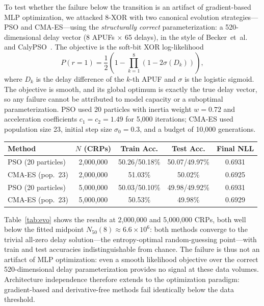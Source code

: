 To test whether the failure below the transition is an artifact of
gradient-based MLP optimization, we attacked 8-XOR with two canonical
evolution strategies---PSO and CMA-ES---using the \emph{structurally
correct} parameterization: a 520-dimensional delay vector (8 APUFs
$\times$ 65 delays), in the style of
Becker~et~al.~\cite{becker2015cia} and CalyPSO~\cite{calypso2024}.  The
objective is the soft-bit XOR log-likelihood
\[
P(r = 1) = \frac{1}{2}\left(1 - \prod_{k=1}^{8}\left(1 - 2\sigma(D_k)\right)\right),
\]
where $D_k$ is the delay difference of the $k$-th APUF and $\sigma$ is the
logistic sigmoid.  The objective is smooth, and its global optimum is exactly the true delay
vector, so any failure cannot be attributed to model capacity or a
suboptimal parameterization.  PSO used 20 particles
with inertia weight $w = 0.72$ and acceleration coefficients
$c_1 = c_2 = 1.49$ for 5{,}000 iterations; CMA-ES used population size 23,
initial step size $\sigma_0 = 0.3$, and a budget of 10{,}000 generations.

\tablefloatbegin
\centering
\caption{Evolution-strategy baselines on 8-XOR, all below the transition
midpoint.  All runs use the soft-bit XOR log-likelihood over the
520-dimensional delay parameterization; final NLL values equal
$\ln 2 \approx 0.6931$ (the entropy of random guessing), corresponding to
the trivial all-zero delay solution.  PSO rows report two independent runs
(a/b); CMA-ES rows report one run each.  The 5M CMA-ES run was terminated by
its convergence criterion after 5{,}519 generations.  Data source:
\texttt{evolution\_baselines.csv}.}
\label{tab:evo}
\begin{tabular}{lcccc}
\toprule
Method & $N$ (CRPs) & Train Acc. & Test Acc. & Final NLL \\
\midrule
PSO (20 particles) & 2{,}000{,}000 & 50.26/50.18\% & 50.07/49.97\% & 0.6931 \\
CMA-ES (pop.\ 23)  & 2{,}000{,}000 & 51.03\%       & 50.02\%       & 0.6925 \\
PSO (20 particles) & 5{,}000{,}000 & 50.03/50.10\% & 49.98/49.92\% & 0.6931 \\
CMA-ES (pop.\ 23)  & 5{,}000{,}000 & 50.53\%       & 49.98\%       & 0.6929 \\
\bottomrule
\end{tabular}
\tablefloatend

Table~\ref{tab:evo} shows the results at 2{,}000{,}000 and 5{,}000{,}000
CRPs, both well below the fitted midpoint $N_{50}(8) \approx 6.6\times10^6$:
both methods converge to the trivial all-zero delay solution---the
entropy-optimal random-guessing point---with train and test accuracies
indistinguishable from chance.  The failure is thus not an artifact of MLP
optimization: even a smooth likelihood objective over the correct
520-dimensional delay parameterization provides no signal at these data
volumes.  Architecture independence therefore extends to the optimization
paradigm: gradient-based and derivative-free methods fail identically
below the data threshold.

